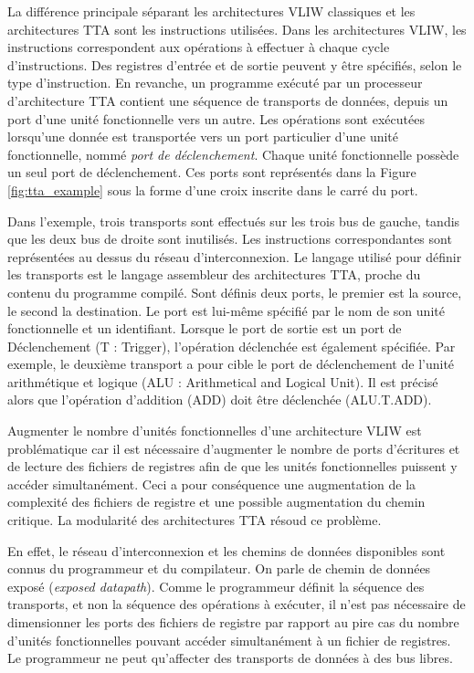La différence principale séparant les architectures VLIW classiques et les architectures TTA sont les instructions utilisées. Dans les architectures VLIW, les instructions correspondent aux opérations à effectuer à chaque cycle d'instructions. Des registres d'entrée et de sortie peuvent y être spécifiés, selon le type d'instruction. En revanche, un programme exécuté par un processeur d'architecture TTA contient une séquence de transports de données, depuis un port d'une unité fonctionnelle vers un autre. Les opérations sont exécutées lorsqu'une donnée est transportée vers un port particulier d'une unité fonctionnelle, nommé \textit{port de déclenchement}. Chaque unité fonctionnelle possède un seul port de déclenchement. Ces ports sont représentés dans la Figure \ref{fig:tta_example} sous la forme d'une croix inscrite dans le carré du port.

Dans l'exemple, trois transports sont effectués sur les trois bus de gauche, tandis que les deux bus de droite sont inutilisés. Les instructions correspondantes sont représentées au dessus du réseau d'interconnexion. Le langage utilisé pour définir les transports est le langage assembleur des architectures TTA, proche du contenu du programme compilé. Sont définis deux ports, le premier est la source, le second la destination. Le port est lui-même spécifié par le nom de son unité fonctionnelle et un identifiant. Lorsque le port de sortie est un port de Déclenchement (T : Trigger), l'opération déclenchée est également spécifiée. Par exemple, le deuxième transport a pour cible le port de déclenchement de l'unité arithmétique et logique (ALU : Arithmetical and Logical Unit). Il est précisé alors que l'opération d'addition (ADD) doit être déclenchée (ALU.T.ADD).

Augmenter le nombre d'unités fonctionnelles d'une architecture VLIW est problématique car il est nécessaire d'augmenter le nombre de ports d'écritures et de lecture des fichiers de registres afin de que les unités fonctionnelles puissent y accéder simultanément. Ceci a pour conséquence une augmentation de la complexité des fichiers de registre et une possible augmentation du chemin critique.
La modularité des architectures TTA résoud ce problème.

En effet, le réseau d'interconnexion et les chemins de données disponibles sont connus du programmeur et du compilateur. On parle de \og chemin de données exposé \fg (\textit{exposed datapath}). Comme le programmeur définit la séquence des transports, et non la séquence des opérations à exécuter, il n'est pas nécessaire de dimensionner les ports des fichiers de registre par rapport au pire cas du nombre d'unités fonctionnelles pouvant accéder simultanément à un fichier de registres. Le programmeur ne peut qu'affecter des transports de données à des bus libres.

